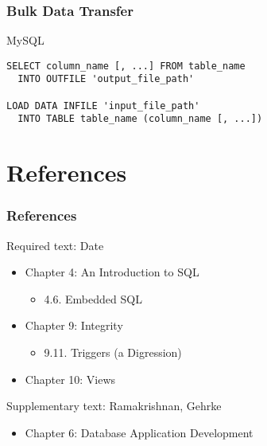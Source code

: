 \documentclass[dvipsnames]{beamer}
\theoremstyle{plain}
\begin{document}
\begin{frame}[fragile]
  \frametitle{Bulk Data Transfer}

  \begin{block}{MySQL}
    \begin{lstlisting}
SELECT column_name [, ...] FROM table_name
  INTO OUTFILE 'output_file_path'

LOAD DATA INFILE 'input_file_path'
  INTO TABLE table_name (column_name [, ...])
    \end{lstlisting}
  \end{block}
\end{frame}

\section*{References}

\begin{frame}
  \frametitle{References}

  \begin{block}{Required text: Date}
    \begin{itemize}
      \item Chapter 4: An Introduction to SQL
      \begin{itemize}
        \item 4.6. Embedded SQL
      \end{itemize}

      \item Chapter 9: Integrity
      \begin{itemize}
        \item 9.11. \alert{Triggers (a Digression)}
      \end{itemize}

      \item Chapter 10: \alert{Views}
    \end{itemize}
  \end{block}

  \begin{block}{Supplementary text: Ramakrishnan, Gehrke}
    \begin{itemize}
      \item Chapter 6: Database Application Development
    \end{itemize}
  \end{block}
\end{frame}
\end{document}
